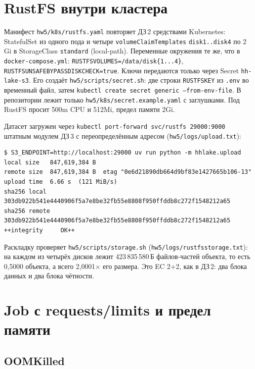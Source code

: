 \documentclass[11pt,a4paper]{article}
\DeclareRobustCommand{\code}[1]{\begingroup\renewcommand{\_}{\textunderscore\allowbreak}\renewcommand{\slash}{/\allowbreak}\texttt{#1}\endgroup}
\newcommand{\logf}[1]{\code{hw5\slash logs\slash #1}}
\begin{document}
\section{RustFS внутри кластера}

Манифест \code{hw5/k8s/rustfs.yaml} повторяет ДЗ\,2 средствами Kubernetes: StatefulSet из одного пода и четыре \code{volumeClaimTemplates} \code{disk1..disk4} по 2\,Gi в StorageClass \code{standard} (local-path). Переменные окружения те же, что в \code{docker-compose.yml}: \code{RUSTFS\_VOLUMES=\slash data\slash disk\{1...4\}}, \code{RUSTFS\_UNSAFE\_BYPASS\_DISK\_CHECK=true}. Ключи передаются только через Secret \code{hh-lake-s3}. Его создаёт \code{hw5/scripts/secret.sh}: две строки \code{RUSTFS\_*\_KEY} из \code{.env} во временный файл, затем \code{kubectl create secret generic --from-env-file}. В репозитории лежит только \code{hw5/k8s/secret.example.yaml} с заглушками. Под RustFS просит 500m CPU и 512Mi, предел памяти 2Gi.

Датасет загружен через \code{kubectl port-forward svc/rustfs 29000:9000} штатным модулем ДЗ\,3 с переопределённым адресом (\logf{01\_upload.txt}):
\begin{lstlisting}
$ S3_ENDPOINT=http://localhost:29000 uv run python -m hhlake.upload
local size   847,619,384 B
remote size  847,619,384 B  etag "0e6d21890db664d9bf83e1427665b106-13"
upload time  6.66 s  (121 MiB/s)
sha256 local  303db922b541e4440906f5a7e8be32fb55e8808f950ffddb8c272f1548212a65
sha256 remote 303db922b541e4440906f5a7e8be32fb55e8808f950ffddb8c272f1548212a65
++integrity     OK++
\end{lstlisting}
Раскладку проверяет \code{hw5/scripts/storage.sh} (\logf{02\_rustfs\_storage.txt}): на каждом из четырёх дисков лежит 423\,835\,580\,Б файлов-частей объекта, то есть 0,5000 объекта, а всего 2,0001$\times$ его размера. Это EC 2+2, как в ДЗ\,2: два блока данных и два блока чётности.

\section{Job с requests/limits и предел памяти}

\subsection{OOMKilled}
\end{document}
